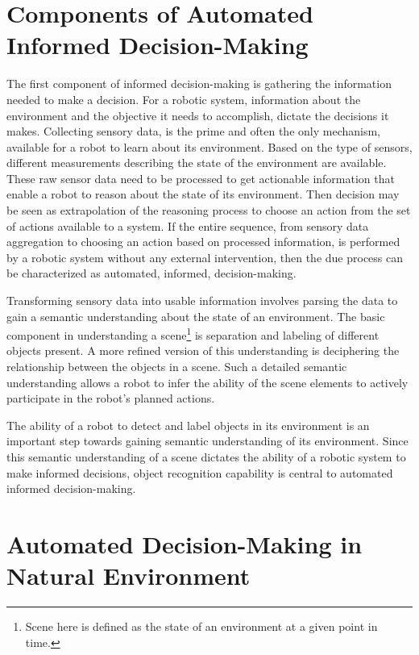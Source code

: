 \documentclass {udthesis}
\begin{document}
\section{Components of Automated Informed Decision-Making}

The first component of informed decision-making is gathering the information needed to make a decision. 
For a robotic system,
information about the environment and the objective it needs to accomplish, dictate the decisions it makes. 
Collecting sensory data, is the prime 
and often the only mechanism, available for a robot to learn about its environment. Based on the 
type of sensors, different measurements describing the state of the environment are available. 
These raw sensor data need to be processed to get actionable information that enable a robot to reason about the state of its environment. 
Then decision may be seen as extrapolation of the reasoning process to choose an action from the set of actions available to a system.
If the entire sequence, from sensory data aggregation to choosing an action based on processed information, is performed by
a robotic system without any external intervention, then the due process can be characterized as automated, informed, decision-making. 

Transforming sensory data into usable information involves parsing the data to gain a semantic understanding about the state of an environment.
The basic component in understanding a scene\footnote{Scene here is defined as the state of an environment at a given point in time.} is separation and labeling of different objects present.
A more refined version of this understanding is deciphering the relationship between the objects in a scene.
Such a detailed semantic understanding allows a robot to infer the ability of the scene elements 
to actively participate in the robot's planned actions.

The ability of a robot to detect and label objects in its environment is an important step towards gaining semantic understanding of its environment.
Since this semantic understanding of a scene dictates the ability of a robotic system to make informed decisions, object recognition capability
is central to automated informed decision-making.

\section{Automated Decision-Making in Natural Environment}
\end{document}
